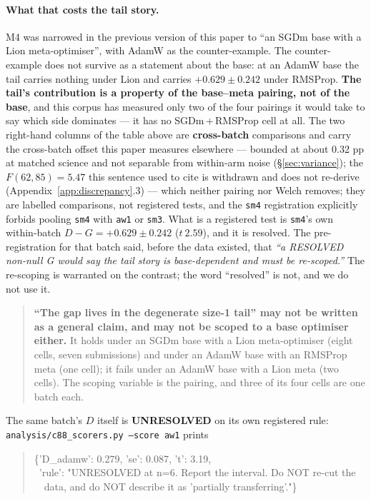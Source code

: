 \documentclass[10pt,letterpaper]{article}
\newcommand{\Dstat}{D}                         %
\newcommand{\Gstat}{G}                         %
\newcommand{\arm}[1]{\texttt{#1}}
\begin{document}
\paragraph{What that costs the tail story.}
M4 was narrowed in the previous version of this paper to ``an SGDm base with a Lion meta-optimiser'', with AdamW
as the counter-example. The counter-example does not survive as a statement about the base: at an
AdamW base the tail carries nothing under Lion and carries $+0.629 \pm 0.242$ under RMSProp.
\textbf{The tail's contribution is a property of the base--meta pairing, not of the base}, and
this corpus has measured only two of the four pairings it would take to say which side dominates
--- it has no SGDm\,+\,RMSProp cell at all. The two right-hand columns of the table above are
\textbf{cross-batch} comparisons and carry the cross-batch offset this paper measures elsewhere
--- bounded at about 0.32 pp at matched science and not separable from within-arm noise
(\S\ref{sec:variance}); the $F(62,85) = 5.47$ this sentence used to cite is withdrawn and does not
re-derive (Appendix~\ref{app:discrepancy}.3) --- which neither pairing nor Welch removes; they are
labelled comparisons, not registered tests, and the \arm{sm4} registration explicitly forbids
pooling \arm{sm4} with \arm{aw1} or \arm{sm3}. What is a registered test is \arm{sm4}'s own
within-batch $\Dstat - \Gstat = +0.629 \pm 0.242$ ($t\ 2.59$), and it is resolved. The pre-registration for that batch said, before
the data existed, that \emph{``a RESOLVED non-null G would say the tail story is base-dependent
and must be re-scoped.''} The re-scoping is warranted on the contrast; the word ``resolved'' is
not, and we do not use it.

\begin{quote}
\textbf{``The gap lives in the degenerate size-1 tail'' may not be written as a general claim, and
may not be scoped to a base optimiser either.} It holds under an SGDm base with a Lion
meta-optimiser (eight cells, seven submissions) and under an AdamW base with an RMSProp meta (one
cell); it fails under an AdamW base with a Lion meta (two cells). The scoping variable is the
pairing, and three of its four cells are one batch each.
\end{quote}

The same batch's $\Dstat$ itself is \textbf{UNRESOLVED} on its own registered rule:
\texttt{analysis/c88\_scorers.py --score aw1} prints

\begin{quote}\ttfamily\footnotesize
\{'D\_adamw': 0.279, 'se': 0.087, 't': 3.19,\\
\ 'rule': "UNRESOLVED at n=6. Report the interval. Do NOT re-cut the\\
\ \ data, and do NOT describe it as 'partially transferring'."\}
\end{quote}
\end{document}
